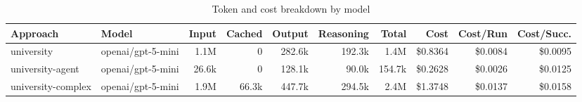 \begin{table}[htbp]
\centering
\caption{Token and cost breakdown by model}
\label{tab:token-breakdown}
\begin{tabular}{llrrrrrrrr}
\toprule
Approach & Model & Input & Cached & Output & Reasoning & Total & Cost & Cost/Run & Cost/Succ. \\
\midrule
university & openai/gpt-5-mini & 1.1M & 0 & 282.6k & 192.3k & 1.4M & \$0.8364 & \$0.0084 & \$0.0095 \\
university-agent & openai/gpt-5-mini & 26.6k & 0 & 128.1k & 90.0k & 154.7k & \$0.2628 & \$0.0026 & \$0.0125 \\
university-complex & openai/gpt-5-mini & 1.9M & 66.3k & 447.7k & 294.5k & 2.4M & \$1.3748 & \$0.0137 & \$0.0158 \\
\bottomrule
\end{tabular}
\end{table}
